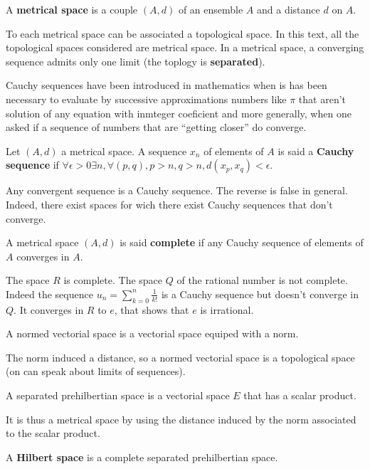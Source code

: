 \documentclass[12pt]{book}
\begin{document}
\begin{defn}
A {\bf metrical space} is a couple $(A,d)$ of an ensemble $A$ and a distance
$d$ on $A$. 
\end{defn}
To each metrical space can be associated a topological space.
In this text, all the topological spaces considered are
metrical space.
In a metrical space, a converging sequence admits only one limit (the
toplogy is {\bf separated}).

Cauchy sequences have been introduced in mathematics when is has been
necessary to evaluate by successive approximations numbers like $\pi$
that aren't solution of any equation with inmteger coeficient and more
generally, when one asked if a sequence of numbers that are ``getting
closer'' do converge.
\begin{defn}
Let $(A,d)$ a metrical space. A sequence $x_n$ of elements of $A$ is
said a {\bf Cauchy sequence} if $\forall \epsilon >0 \exists n, \forall
(p,q), p>n, q>n, d(x_p,x_q)<\epsilon$. 
\end{defn}
Any convergent sequence is a Cauchy sequence. The reverse is false in
general. Indeed, there exist spaces for wich there exist Cauchy
sequences that don't converge. 
\begin{defn}
A metrical space $(A,d)$ is said {\bf complete} if any Cauchy sequence of
elements of $A$ converges in $A$.
\end{defn}
The space $R$ is complete.
The space $Q$ of the rational number is not complete. Indeed the
sequence $u_n=\sum_{k=0}^n\frac{1}{k!}$ is a Cauchy sequence but
doesn't converge in $Q$. It converges in $R$ to $e$, that shows that
$e$ is irrational.

\begin{defn}
A normed vectorial space is a vectorial space equiped with a norm.
\end{defn}
The norm induced a distance, so a normed vectorial space is a
topological space (on can speak about limits of sequences).

\begin{defn}
A separated prehilbertian space is a vectorial space $E$ that has a
scalar product.
\end{defn}
It is thus a metrical space by using the distance induced by the norm
associated to the scalar
product.

\begin{defn}
A {\bf Hilbert space} is a  complete separated prehilbertian space.
\end{defn}
\end{document}
